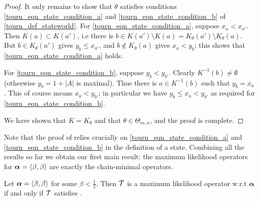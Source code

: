 \begin{proof}
    It only remains to show that $\theta$ satisfies conditions
    \cref{tourn_eqn_state_condition_a} and \cref{tourn_eqn_state_condition_b} of
    \cref{tourn_def_stateworld}. For \cref{tourn_eqn_state_condition_a}, suppose $x_a
    < x_{a'}$. Then $K(a) \subset K(a')$, i.e there is $b \in K(a') \setminus
    K(a) = K_\theta(a') \setminus K_\theta(a)$. But $b \in K_\theta(a')$ gives
    $y_b \le x_{a'}$, and $b \not\in K_\theta(a)$ gives $x_a < y_b$; this shows
    that \cref{tourn_eqn_state_condition_a} holds.

    For \cref{tourn_eqn_state_condition_b}, suppose $y_b < y_{b'}$. Clearly
    $K^{-1}(b) \ne \emptyset$ (otherwise $y_b = 1 + |A|$ is maximal). Thus
    there is $a \in K^{-1}(b)$ such that $y_b = x_a$. This of course means $x_a
    < y_{b'}$; in particular we have $y_b \le x_a < y_{b'}$ as required for
    \cref{tourn_eqn_state_condition_b}.

    We have shown that $K = K_\theta$ and that $\theta \in \Theta_{m,n}$, and the
    proof is complete.
\end{proof}

Note that the proof of  relies crucially on
\cref{tourn_eqn_state_condition_a} and
\cref{tourn_eqn_state_condition_b} in the definition of a state. Combining
all the results so far we obtain our first main result: the maximum likelihood
operators for $\bm{\alpha} = \langle {\beta,\beta} \rangle$ are exactly the chain-minimal
operators.

\begin{theorem}
   \label{tourn_result_mle_iff_chainmin_operator}
   Let $\bm{\alpha} = \langle {\beta, \beta} \rangle$ for some $\beta < \frac{1}{2}$.
   Then $\mathcal{T}$ is a maximum likelihood operator w.r.t $\bm{\alpha}$
    if and only if $\mathcal{T}$ satisfies \chainmin{}.
\end{theorem}

